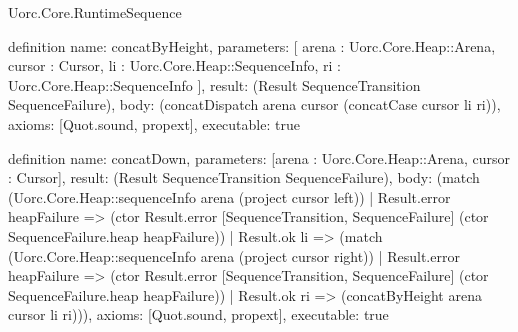 \begin{lexlean}{Uorc.Core.RuntimeSequence}
\begin{semanticmodule}
definition{
  name: concatByHeight,
  parameters: [
    arena : Uorc.Core.Heap::Arena,
    cursor : Cursor,
    li : Uorc.Core.Heap::SequenceInfo,
    ri : Uorc.Core.Heap::SequenceInfo
  ],
  result: (Result SequenceTransition SequenceFailure),
  body: (concatDispatch arena cursor (concatCase cursor li ri)),
  axioms: [Quot.sound, propext],
  executable: true
}

definition{
  name: concatDown,
  parameters: [arena : Uorc.Core.Heap::Arena, cursor : Cursor],
  result: (Result SequenceTransition SequenceFailure),
  body: (match (Uorc.Core.Heap::sequenceInfo arena (project cursor left))
    | Result.error heapFailure => (ctor Result.error [SequenceTransition, SequenceFailure] (ctor SequenceFailure.heap heapFailure))
    | Result.ok li => (match (Uorc.Core.Heap::sequenceInfo arena (project cursor right))
      | Result.error heapFailure => (ctor Result.error [SequenceTransition, SequenceFailure] (ctor SequenceFailure.heap heapFailure))
      | Result.ok ri => (concatByHeight arena cursor li ri))),
  axioms: [Quot.sound, propext],
  executable: true
}


\end{semanticmodule}
\end{lexlean}
